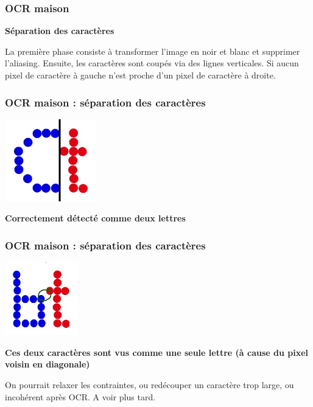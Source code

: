 \documentclass[xcolor=dvipsnames]{beamer}
\begin{document}
\begin{frame}
\frametitle{OCR maison}
    \begin{center}\begin{alertblock}{}
            \begin{center}
            \textbf{\Large Séparation des caractères}
            \end{center}

La première phase consiste à transformer l'image en noir et blanc et supprimer l'aliasing. Ensuite, les caractères sont coupés via des lignes verticales. Si aucun pixel de caractère à gauche n'est proche d'un pixel de caractère à droite.

    \end{alertblock}\end{center}
\end{frame}

\begin{frame}
\frametitle{OCR maison : séparation des caractères}
       \includegraphics[width=150px]{10x9_Ct_split.png}
      \begin{alertblock}{}
            \begin{center}
                  \textbf{\Large Correctement détecté comme deux lettres}
            \end{center}
      \end{alertblock}
\end{frame}

\begin{frame}
\frametitle{OCR maison : séparation des caractères }
       \includegraphics[width=120px]{9x9_bt_conflit.png}
      \begin{alertblock}{}
            \begin{center}
                  \textbf{\Large Ces deux caractères sont vus comme une seule lettre (à cause du pixel voisin en diagonale)}
            \end{center}
      \end{alertblock}

On pourrait relaxer les contraintes, ou redécouper un caractère trop large, ou incohérent après OCR. A voir plus tard.

\end{frame}
\end{document}
